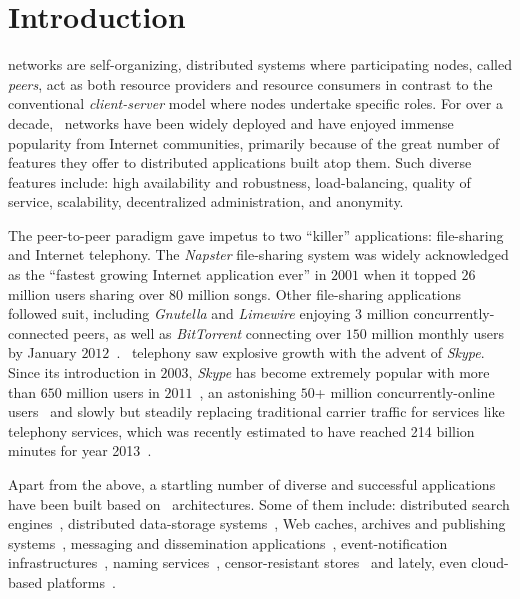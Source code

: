 \section{Introduction}
\label{section:intro}

 networks are self-organizing, distributed systems where
participating nodes, called \emph{peers}, act as both resource providers and
resource consumers in contrast to the conventional \emph{client-server} model
where nodes undertake specific roles.
For over a decade, \p\ networks have been widely deployed and have
enjoyed immense popularity from Internet communities, primarily because
of the great number of features they offer to distributed applications 
built atop them. 
Such diverse features include:  high availability and robustness,
load-balancing, quality of service, scalability, decentralized administration,
and anonymity. 

The peer-to-peer paradigm gave impetus to two ``killer'' applications:
file-sharing and Internet telephony.
The {\sl Napster} file-sharing system was widely acknowledged as the 
``fastest growing Internet application ever'' in $2001$ when it topped
$26$ million users sharing over $80$ million songs.
Other file-sharing applications followed suit, 
including {\sl Gnutella} and {\sl Limewire} enjoying $3$ 
million concurrently-connected peers, as well as 
{\sl BitTorrent} connecting over $150$ million monthly users by January $2012$~\cite{bittorrentusers}.
\p\ telephony saw explosive growth with the advent of {\sl Skype}.
Since its introduction in $2003$,
{\sl Skype} has become extremely popular with more than $650$ million users 
in $2011$~\cite{skypetotalusers}, an astonishing $50$+ million concurrently-online
users~\cite{skypesymusers} and slowly but steadily replacing traditional
carrier traffic for services like telephony services, which was recently estimated to
have reached 214 billion minutes for year 2013~\cite{skypetraffic}.

Apart from the above, a startling number of diverse and successful
applications have been built based on \p\ architectures. Some of them include:
distributed search engines~\cite{yaci}, 
distributed data-storage systems~\cite{kbc_oceanstore_2000,bdet_fsdfs_2000,dkkms_cfs_2001,dr_pastutility_2001,abc_farsite_2002,mmfc_ivy_2002,arla,agebh_dks_2003},
Web caches, archives and publishing systems~\cite{ird_squirrel_2002,bags_youserv_2002,wrc_publius_2000,wm_tangler_2001},
messaging and dissemination applications~\cite{threedegrees,icpp08-pd}, 
event-notification infrastructures~\cite{rkcd_scribe_2001,cdkr_scribe_2002,agebh_dks_2003}, 
naming services~\cite{cmm_chorddns_2002}, 
censor-resistant stores~\cite{cswh_freenet_2001} and
lately, even cloud-based platforms~\cite{mgpj_cloudsnap_2011}.

